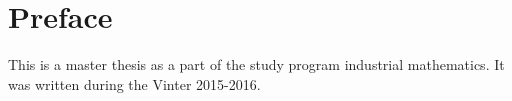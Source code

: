 \section*{Preface}
This is a master thesis as a part of the study program industrial mathematics. It was written during the Vinter 2015-2016. 



